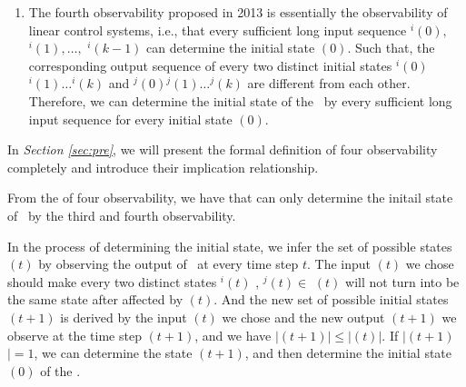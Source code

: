 \begin{enumerate}
	\item  The fourth observability proposed in 2013 \cite{Fornasini2013Observability} is essentially the observability of linear control systems, i.e., that every sufficient long input sequence \Input$^{i}(0),$ \Input$^{i}(1),\ldots,$ \Input$^{i}(k-1)$ can determine the initial state \State$(0)$. Such that, the corresponding output sequence of every two distinct initial states \Output$^{i}(0)$\Output$^{i}(1)\ldots$\Output$^{i}(k)$ and \Output$^{j}(0)$\Output$^{j}(1)\ldots$\Output$^{j}(k)$ are different from each other. Therefore, we can determine the initial state of the \BCN\ by every sufficient long input sequence for every initial state \State$(0)$.
\end{enumerate}
 


In {\em Section \ref{sec:pre}}, we will present the formal definition of four observability completely and introduce their implication relationship. %
\begin{comment}
\ly{In the four existing observability, we can not determine the initail state of \BCNs\ by the first and second observability.} Although we can determine the initail state of \BCNs\ by the third and fourth observability, the requirements for \BCNs\ to determine the initail state are difficult to meet. Thus, we consider that whether we can determine the initial state of some \BCNs\ which can not be determined by the third and fourth observability.
\end{comment}
From the of four observability, we have that can only determine the initail state of \BCNs\ by the third and fourth observability.

In the process of determining the initial state, we infer the set of possible states \Ustate$(t)$ by observing the output of \BCN\ at every time step $t$. The input \Input$(t)$ we chose should make every two distinct states \State$^{i}(t)$ , \State$^{j}(t)$$\in$ \Ustate$(t)$ will not turn into be the same state after affected by \Input$(t)$. And the new set of possible initial states \Ustate$(t+1)$ is derived by the input \Input$(t)$ we chose and the new output \Output$(t+1)$ we observe at the time step $(t+1)$, and we have $|$\Ustate$(t+1)$$|\le|$\Ustate$(t)$$|$. If $|$\Ustate$(t+1)$$|=1$, we can determine the state \State$(t+1)$, and then determine the initial state \State$(0)$ of the \BCN.

